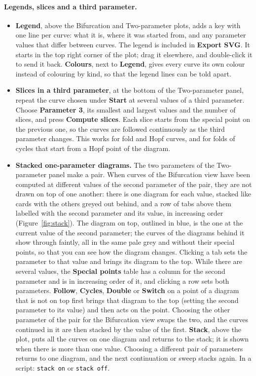 \documentclass[11pt,a4paper]{article}
\newcommand{\ui}[1]{\textsf{\textbf{#1}}}          %
\begin{document}
\paragraph{Legends, slices and a third parameter.}
\begin{itemize}
  \item \ui{Legend}, above the Bifurcation and Two-parameter plots, adds a key with one line per curve: what it is, where it was started from, and any parameter values that differ between curves. The legend is included in \ui{Export SVG}. It starts in the top right corner of the plot; drag it elsewhere, and double-click it to send it back. \ui{Colours}, next to \ui{Legend}, gives every curve its own colour instead of colouring by kind, so that the legend lines can be told apart.
  \item \textbf{Slices in a third parameter}, at the bottom of the Two-parameter panel, repeat the curve chosen under \ui{Start} at several values of a third parameter. Choose \ui{Parameter 3}, its smallest and largest values and the number of slices, and press \ui{Compute slices}. Each slice starts from the special point on the previous one, so the curves are followed continuously as the third parameter changes. This works for fold and Hopf curves, and for folds of cycles that start from a Hopf point of the diagram.
  \item \textbf{Stacked one-parameter diagrams.} The two parameters of the Two-parameter panel make a pair. When curves of the Bifurcation view have been computed at different values of the second parameter of the pair, they are not drawn on top of one another: there is one diagram for each value, stacked like cards with the others greyed out behind, and a row of tabs above them labelled with the second parameter and its value, in increasing order (Figure~\ref{fig:stack}). The diagram on top, outlined in blue, is the one at the current value of the second parameter; the curves of the diagrams behind it show through faintly, all in the same pale grey and without their special points, so that you can see how the diagram changes. Clicking a tab sets the parameter to that value and brings its diagram to the top. While there are several values, the \ui{Special points} table has a column for the second parameter and is in increasing order of it, and clicking a row sets both parameters. \ui{Follow}, \ui{Cycles}, \ui{Double} or \ui{Switch} on a point of a diagram that is not on top first brings that diagram to the top (setting the second parameter to its value) and then acts on the point. Choosing the other parameter of the pair for the Bifurcation view swaps the two, and the curves continued in it are then stacked by the value of the first. \ui{Stack}, above the plot, puts all the curves on one diagram and returns to the stack; it is shown when there is more than one value. Choosing a different pair of parameters returns to one diagram, and the next continuation or sweep stacks again. In a script: \texttt{stack on} or \texttt{stack off}.

\end{itemize}
\end{document}
